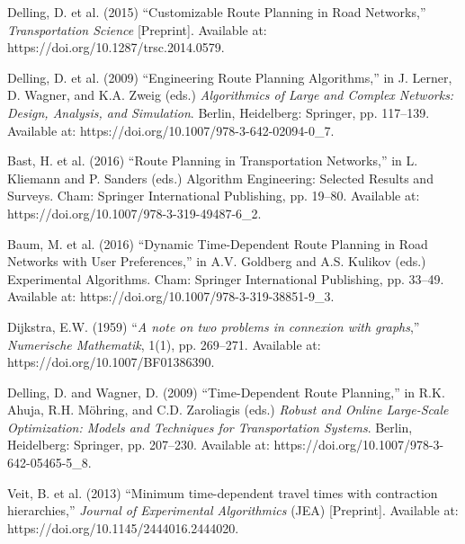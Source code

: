 \begin{thebibliography}{99}
    
        Delling, D. et al. (2015) “Customizable Route Planning in Road Networks,” \textit{Transportation Science} [Preprint]. Available at: https://doi.org/10.1287/trsc.2014.0579.

       
        Delling, D. et al. (2009) “Engineering Route Planning Algorithms,” in J. Lerner, D. Wagner, and K.A. Zweig (eds.) \textit{Algorithmics of Large and Complex Networks: Design, Analysis, and Simulation}. Berlin, Heidelberg: Springer, pp. 117–139. Available at: https://doi.org/10.1007/978-3-642-02094-0\_7.

          
       Bast, H. et al. (2016) “Route Planning in Transportation Networks,” in L. Kliemann and P. Sanders (eds.) Algorithm Engineering: Selected Results and Surveys. Cham: Springer International Publishing, pp. 19–80. Available at: https://doi.org/10.1007/978-3-319-49487-6\_2.


        Baum, M. et al. (2016) “Dynamic Time-Dependent Route Planning in Road Networks with User Preferences,” in A.V. Goldberg and A.S. Kulikov (eds.) Experimental Algorithms. Cham: Springer International Publishing, pp. 33–49. Available at: https://doi.org/10.1007/978-3-319-38851-9\_3.


        Dijkstra, E.W. (1959) “\textit{A note on two problems in connexion with graphs},” \textit{Numerische Mathematik}, 1(1), pp. 269–271. Available at: https://doi.org/10.1007/BF01386390.

        Delling, D. and Wagner, D. (2009) “Time-Dependent Route Planning,” in R.K. Ahuja, R.H. Möhring, and C.D. Zaroliagis (eds.) \textit{Robust and Online Large-Scale Optimization: Models and Techniques for Transportation Systems}. Berlin, Heidelberg: Springer, pp. 207–230. Available at: https://doi.org/10.1007/978-3-642-05465-5\_8.

        
        
        Veit, B. et al. (2013) “Minimum time-dependent travel times with contraction hierarchies,” \textit{Journal of Experimental Algorithmics} (JEA) [Preprint]. Available at: https://doi.org/10.1145/2444016.2444020.



\end{thebibliography}
